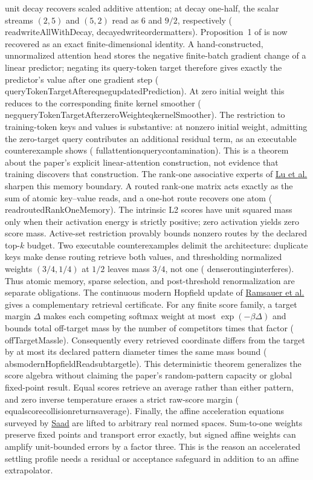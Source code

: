 \documentclass[11pt]{article}
\newcommand{\leanname}[1]{{\scriptsize\ttfamily
  \def\_{\textunderscore\allowbreak}#1}}
\begin{document}
unit decay recovers scaled additive attention; at decay one-half, the scalar streams
$(2,5)$ and $(5,2)$ read as $6$ and $9/2$, respectively
(\leanname{read\_writeAllWithDecay},
\leanname{decayed\_write\_order\_matters}).
Proposition~1 of \cite{vonoswald2023} is now recovered as an exact finite-dimensional
identity. A hand-constructed, unnormalized attention head stores the negative
finite-batch gradient change of a linear predictor; negating its query-token target
therefore gives exactly the predictor's value after one gradient step
(\leanname{queryTokenTargetAfter\_eq\_neg\_updatedPrediction}).
At zero initial weight this reduces to the corresponding finite kernel smoother
(\leanname{neg\_queryTokenTargetAfter\_zeroWeight\_eq\_kernelSmoother}).
The restriction to training-token keys and values is substantive: at nonzero initial
weight, admitting the zero-target query contributes an additional residual term, as an
executable counterexample shows
(\leanname{full\_attention\_query\_contamination}).
This is a theorem about the paper's explicit linear-attention construction, not evidence
that training discovers that construction.
The rank-one associative experts of
\href{https://arxiv.org/abs/2506.21035}{Lu et al.} sharpen this memory boundary.
A routed rank-one matrix acts exactly as the sum of atomic key--value reads, and a
one-hot route recovers one atom
(\leanname{read\_routedRankOneMemory}).
The intrinsic L2 scores have unit squared mass only when their activation energy is
strictly positive; zero activation yields zero score mass. Active-set restriction
provably bounds nonzero routes by the declared top-$k$ budget. Two executable
counterexamples delimit the architecture: duplicate keys make dense routing retrieve
both values, and thresholding normalized weights $(3/4,1/4)$ at $1/2$ leaves mass
$3/4$, not one
(\leanname{dense\_routing\_interferes}).
Thus atomic memory, sparse selection, and post-threshold renormalization are separate
obligations.
The continuous modern Hopfield update of
\href{https://arxiv.org/abs/2008.02217}{Ramsauer et al.} gives a complementary
retrieval certificate. For any finite score family, a target margin $\Delta$ makes
each competing softmax weight at most $\exp(-\beta\Delta)$ and bounds total
off-target mass by the number of competitors times that factor
(\leanname{offTargetMass\_le}).
Consequently every retrieved coordinate differs from the target by at most its
declared pattern diameter times the same mass bound
(\leanname{abs\_modernHopfieldRead\_sub\_target\_le}).
This deterministic theorem generalizes the score algebra without claiming the
paper's random-pattern capacity or global fixed-point result. Equal scores retrieve
an average rather than either pattern, and zero inverse temperature erases a strict
raw-score margin
(\leanname{equal\_score\_collision\_returns\_average}).
Finally, the affine acceleration equations surveyed by
\href{https://arxiv.org/abs/2507.11746}{Saad} are lifted to arbitrary real normed
spaces. Sum-to-one weights preserve fixed points and transport error exactly, but signed
affine weights can amplify unit-bounded errors by a factor three. This is the reason an
accelerated settling profile needs a residual or acceptance safeguard in addition to an
affine extrapolator.
\end{document}
